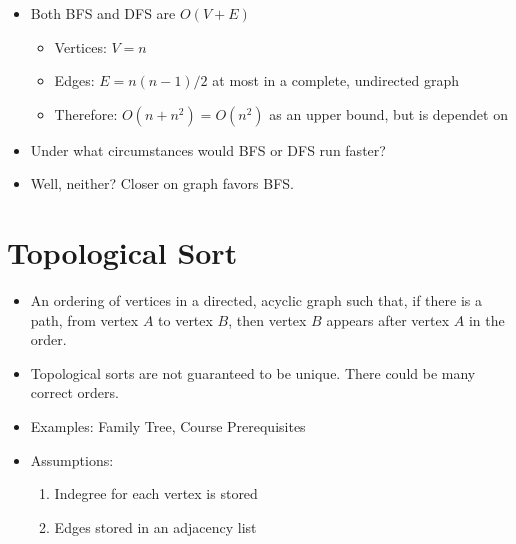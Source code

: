 \begin{itemize}

    \item Both BFS and DFS are $O(V + E)$
    \begin{itemize}
        \item Vertices: $V = n$
        \item Edges: $E = n(n-1)/2$ at most in a complete, undirected graph
        \item Therefore: $O(n + n^2) = O(n^2)$ as an upper bound, but is dependet on
    \end{itemize}

    \item Under what circumstances would BFS or DFS run faster?

    \item Well, neither? Closer on graph favors BFS.

\end{itemize}

\section*{Topological Sort}

\begin{itemize}

    \item An ordering of vertices in a directed, acyclic graph such that, if there is a path, from vertex $A$ to vertex $B$, then vertex $B$ appears after vertex $A$ in the order. \\
    
\end{itemize}


\begin{itemize}

    \item Topological sorts are not guaranteed to be unique. There could be many correct orders.

    \item Examples: Family Tree, Course Prerequisites

    \item Assumptions:
    \begin{enumerate}
        \item Indegree for each vertex is stored
        \item Edges stored in an adjacency list
    \end{enumerate}

\end{itemize}

